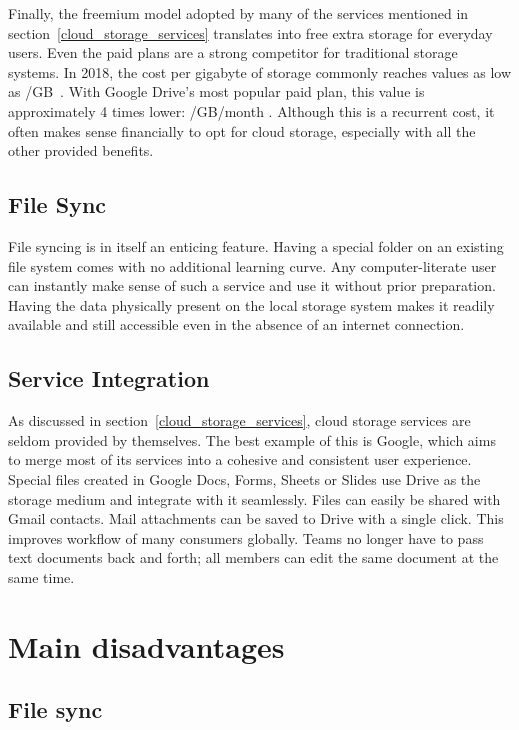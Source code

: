 Finally, the freemium model adopted by many of the services mentioned in section~\ref{cloud_storage_services} translates into free extra storage for everyday users. Even the paid plans are a strong competitor for traditional storage systems. In 2018, the cost per gigabyte of storage commonly reaches values as low as \mbox{\slash GB}~\cite{hard_drive_cost_per_gigabyte}. With Google Drive's most popular paid plan, this value is approximately 4 times lower: \mbox{\slash GB\slash month} \cite{google_drive_pricing}. Although this is a recurrent cost, it often makes sense financially to opt for cloud storage, especially with all the other provided benefits.

\subsection{File Sync}

File syncing is in itself an enticing feature. Having a special folder on an existing file system comes with no additional learning curve. Any computer-literate user can instantly make sense of such a service and use it without prior preparation. Having the data physically present on the local storage system makes it readily available and still accessible even in the absence of an internet connection.

\subsection{Service Integration}

As discussed in section~\ref{cloud_storage_services}, cloud storage services are seldom provided by themselves. The best example of this is Google, which aims to merge most of its services into a cohesive and consistent user experience. Special files created in Google Docs, Forms, Sheets or Slides use Drive as the storage medium and integrate with it seamlessly. Files can easily be shared with Gmail contacts. Mail attachments can be saved to Drive with a single click. This improves workflow of many consumers globally. Teams no longer have to pass text documents back and forth; all members can edit the same document at the same time.

\section{Main disadvantages} \label{main_disadvantages}

\subsection{File sync}

